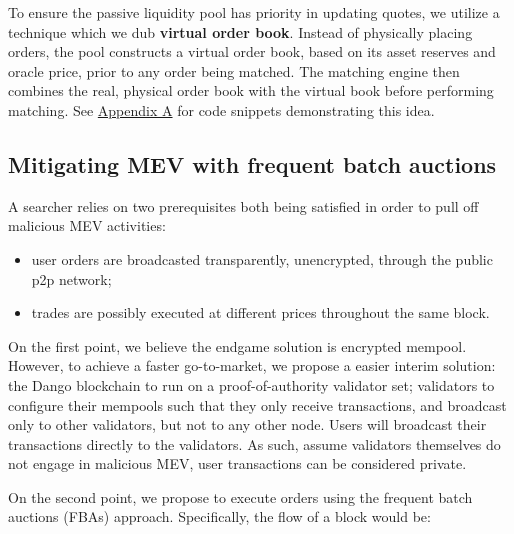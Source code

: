 \documentclass{article}
\begin{document}
To ensure the passive liquidity pool has priority in updating quotes, we utilize a technique which we dub \textbf{virtual order book}. Instead of physically placing orders, the pool constructs a virtual order book, based on its asset reserves and oracle price, prior to any order being matched. The matching engine then combines the real, physical order book with the virtual book before performing matching. See \hyperref[sec:appendixa]{Appendix A} for code snippets demonstrating this idea.

\subsection{Mitigating MEV with frequent batch auctions}

A searcher relies on two prerequisites both being satisfied in order to pull off malicious MEV activities:

\begin{itemize}
  \item user orders are broadcasted transparently, unencrypted, through the public p2p network;
  \item trades are possibly executed at different prices throughout the same block.
\end{itemize}

On the first point, we believe the endgame solution is encrypted mempool.\supercite{encryptedmempool} However, to achieve a faster go-to-market, we propose a easier interim solution: the Dango blockchain to run on a proof-of-authority validator set; validators to configure their mempools such that they only receive transactions, and broadcast only to other validators, but not to any other node. Users will broadcast their transactions directly to the validators. As such, assume validators themselves do not engage in malicious MEV, user transactions can be considered private.

On the second point, we propose to execute orders using the frequent batch auctions (FBAs) approach.\supercite{frequentbatchauctions,frequentbatchauctions2} Specifically, the flow of a block would be:
\end{document}
